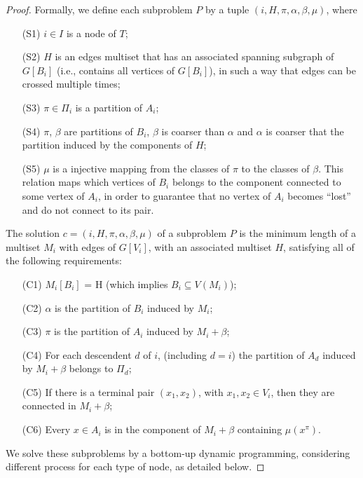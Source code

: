 \begin{proof}
Formally, we define each subproblem \(P\) by a tuple \((i, H, \pi, \alpha, \beta, \mu)\), where 

\begin{itemize}
    \item[(S1)] \(i \in I\) is a node of \(T\);
    \item[(S2)] \(H\) is an edges multiset that has an associated spanning subgraph of \(G[B_i]\) (i.e., contains all vertices of \(G[B_i]\)), in such a way that edges can be crossed multiple times;
    \item[(S3)] \(\pi \in \Pi_i\) is a partition of \(A_i\);
    \item[(S4)] \(\pi\), \(\beta\) are partitions of \(B_i\), \(\beta\) is coarser than \(\alpha\) and \(\alpha\) is coarser that the partition induced by the components of \(H\);
    \item[(S5)] \(\mu\) is a injective mapping from the classes of \(\pi\) to the classes of \(\beta\). This relation maps which vertices of \(B_i\) belongs to the component connected to some vertex of \(A_i\), in order to guarantee that no vertex of \(A_i\) becomes ``lost'' and do not connect to its pair.
\end{itemize}

The solution \(c = (i, H, \pi, \alpha, \beta, \mu)\) of a subproblem \(P\) is the minimum length of a multiset \(M_i\) with edges of \(G[V_i]\), with an associated multiset \(H\), satisfying all of the following requirements:

\begin{itemize}
    \item[(C1)] \(M_i[B_i]\) = H (which implies \(B_i \subseteq V(M_i)\));
    \item[(C2)] \(\alpha\) is the partition of \(B_i\) induced by \(M_i\);
    \item[(C3)] \(\pi\) is the partition of \(A_i\) induced by \(M_i + \beta\);
    \item[(C4)] For each descendent \(d\) of \(i\), (including \(d = i\)) the partition of \(A_d\) induced by \(M_i + \beta\) belongs to \(\Pi_d\);
    \item[(C5)] If there is a terminal pair \((x_1, x_2)\), with \(x_1, x_2 \in V_i\), then they are connected in \(M_i + \beta\);
    \item[(C6)] Every \(x \in A_i\) is in the component of \(M_i + \beta\) containing \(\mu(x^\pi)\).
\end{itemize}

We solve these subproblems by a bottom-up dynamic programming, considering different process for each type of node, as detailed below.


\end{proof}
